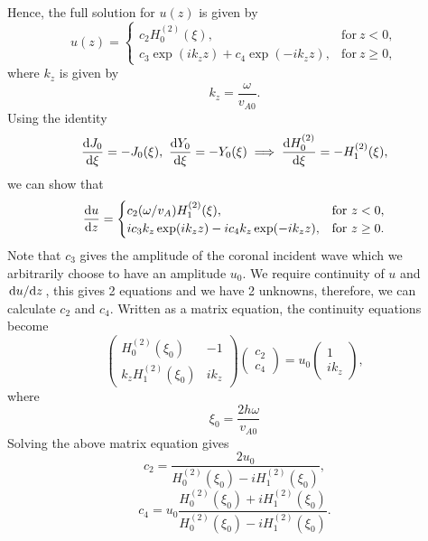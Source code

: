 Hence, the full solution for $u(z)$ is given by
\begin{equation}
    \label{eq:reflection_coefficent_u}
    u(z) = \begin{cases}
    c_2 H_0^{(2)}(\xi), & \text{for}\ z<0,\\
    c_3\exp(ik_z z) + c_4\exp(-ik_z z), & \text{for}\ z\ge0,
    \end{cases}
\end{equation}
where $k_z$ is given by
\begin{equation}
    k_z = \frac{\omega}{v_{A0}}.
\end{equation}
Using the identity
\begin{equation}
    \dv{J_0}{\xi}=-J_0(\xi),\ \dv{Y_0}{\xi}=-Y_0(\xi)\implies \dv{H_0^{(2)}}{\xi}=-H_1^{(2)}(\xi),
\end{equation}
we can show that
\begin{equation}
    \label{eq:reflection_coefficent_du_dz}
    \dv{u}{z}=\begin{cases}
    c_2(\omega / v_A)H_1^{(2)}(\xi), & \text{for}\ z<0, \\
    ic_3k_z\exp(ik_z z) - ic_4k_z\exp(-ik_z z), & \text{for}\ z\ge0. \\
    \end{cases}
\end{equation}
Note that $c_3$ gives the amplitude of the coronal incident wave which we arbitrarily choose to have an amplitude $u_0$. We require continuity of $u$ and $\dv*{u}{z}$, this gives 2 equations and we have 2 unknowns, therefore, we can calculate $c_2$ and $c_4$. Written as a matrix equation, the continuity equations become
\begin{equation}
    \begin{pmatrix}
    H_0^{(2)}(\xi_0) & -1 \\
    k_z H_1^{(2)}(\xi_0) & ik_z 
    \end{pmatrix}
    \begin{pmatrix}
    c_2 \\
    c_4
    \end{pmatrix}
    =u_0\begin{pmatrix}
    1 \\
    ik_z
    \end{pmatrix},
\end{equation}
where
\begin{equation}
    \xi_0=\frac{2h\omega}{v_{A0}}
\end{equation}
Solving the above matrix equation gives
\begin{equation}
    c_2 = \frac{2u_0}{H_0^{(2)}(\xi_0)-iH_1^{(2)}(\xi_0)},
\end{equation}
\begin{equation}
    c_4 = u_0\frac{H_0^{(2)}(\xi_0)+iH_1^{(2)}(\xi_0)}{H_0^{(2)}(\xi_0)-iH_1^{(2)}(\xi_0)}.
\end{equation}

